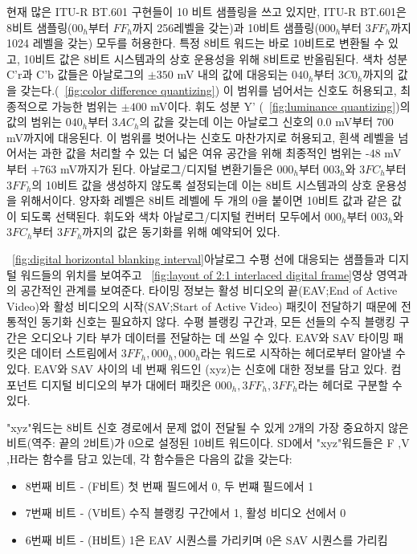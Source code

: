 현재 많은 ITU-R BT.601 구현들이 10 비트 샘플링을 쓰고 있지만, ITU-R BT.601은 8비트 샘플링($00_h$부터 $FF_h$까지 256레벨을 갖는)과 10비트 샘플링($000_h$부터 $3FF_h$까지 1024 레벨을 갖는) 모두를 허용한다.
특정 8비트 워드는 바로 10비트로 변환될 수 있고, 10비트 값은 8비트 시스템과의 상호 운용성을 위해 8비트로 반올림된다. 색차 성분 C'r과 C'b 값들은 아날로그의 $\pm 350$ mV 내의 값에 대응되는 $040_h$부터 $3C0_h$까지의 값을 갖는다.(\figurename~\ref{fig:color difference quantizing})
이 범위를 넘어서는 신호도 허용되고, 최종적으로 가능한 범위는 $\pm 400$ mV이다. 휘도 성분 Y' (\figurename~\ref{fig:luminance quantizing})의 값의 범위는 $040_h$부터 $3AC_h$의 값을 갖는데 이는 아날로그 신호의 0.0 mV부터 700 mV까지에 대응된다.
이 범위를 벗어나는 신호도 마찬가지로 허용되고, 흰색 레벨을 넘어서는 과한 값을 처리할 수 있는 더 넓은 여유 공간을 위해 최종적인 범위는 -48 mV부터 +763 mV까지가 된다.
아날로그/디지털 변환기들은 $000_h$부터 $003_h$와 $3FC_h$부터 $3FF_h$의 10비트 값을 생성하지 않도록 설정되는데 이는 8비트 시스템과의 상호 운용성을 위해서이다.
양자화 레벨은 8비트 레벨에 두 개의 0을 붙이면 10비트 값과 같은 값이 되도록 선택된다. 휘도와 색차 아날로그/디지털 컨버터 모두에서 $000_h$부터 $003_h$와 $3FC_h$부터 $3FF_h$까지의 값은 동기화를 위해 예약되어 있다.


\figurename~\ref{fig:digital horizontal blanking interval}\은 아날로그 수평 선에 대응되는 샘플들과 디지털 워드들의 위치를 보여주고 \figurename~\ref{fig:layout of 2:1 interlaced digital frame}\은 영상 영역과의 공간적인 관계를 보여준다.
타이밍 정보는 활성 비디오의 끝(EAV;End of Active Video)와 활성 비디오의 시작(SAV;Start of Active Video) 패킷이 전달하기 때문에 전통적인 동기화 신호는 필요하지 않다.
수평 블랭킹 구간과, 모든 선들의 수직 블랭킹 구간은 오디오나 기타 부가 데이터를 전달하는 데 쓰일 수 있다. EAV와 SAV 타이밍 패킷은 데이터 스트림에서 $3FF_h, 000_h, 000_h$라는 워드로 시작하는 헤더로부터 알아낼 수 있다.
EAV와 SAV 사이의 네 번째 워드인 (xyz)는 신호에 대한 정보를 담고 있다. 컴포넌트 디지털 비디오의 부가 대에터 패킷은 $000_h, 3FF_h, 3FF_h$라는 헤더로 구분할 수 있다.

"xyz"워드는 8비트 신호 경로에서 문제 없이 전달될 수 있게 2개의 가장 중요하지 않은 비트(역주: 끝의 2비트)가 0으로 설정된 10비트 워드이다.
SD에서 "xyz"워드들은 F ,V ,H라는 함수를 담고 있는데, 각 함수들은 다음의 값을 갖는다:
\begin{itemize}
    \item 8번째 비트 - (F비트) 첫 번째 필드에서 0, 두 번쨰 필드에서 1
    \item 7번째 비트 - (V비트) 수직 블랭킹 구간에서 1, 활성 비디오 선에서 0
    \item 6번째 비트 - (H비트) 1은 EAV 시퀀스를 가리키며 0은 SAV 시퀀스를 가리킴
\end{itemize}

